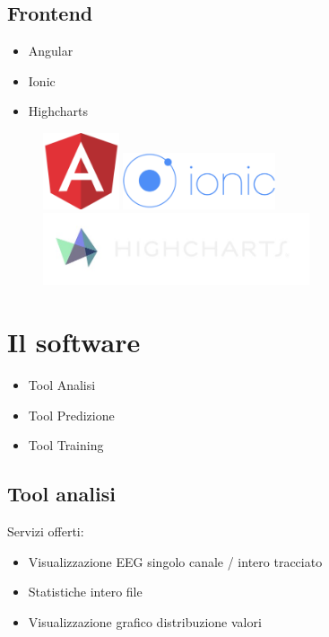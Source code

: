 \documentclass[xcolor=x11names,compress, 
					handout %
]{beamer}
\theoremstyle{definition} \newtheorem{esempio}{Esempio}
\theoremstyle{definition}
\begin{document}
	\subsection{Frontend}
		\begin{frame}{\subsecname}
			\begin{itemize}
				\item Angular
				\item Ionic
				\item Highcharts 
			\end{itemize}
			\begin{figure}
				\includegraphics[width=0.2\textwidth]{immagini/angular}
				\includegraphics[width=0.4\textwidth]{immagini/ionic}
				\includegraphics[width=0.7\textwidth]{immagini/highcharts}
			\end{figure}
		\end{frame}


\section{Il software}
	\begin{frame}{\secname}
		\begin{itemize}
			\item Tool Analisi
			\item Tool Predizione
			\item Tool Training
		\end{itemize}
	\end{frame}
	\subsection{Tool analisi}
		\begin{frame}{\subsecname}
			Servizi offerti:
			\begin{itemize}
				\item Visualizzazione EEG singolo canale / intero tracciato
				\item Statistiche intero file 
				\item Visualizzazione grafico distribuzione valori
			\end{itemize}
		\end{frame}
	
\end{document}
